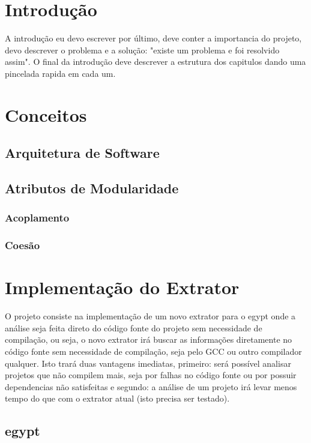 \chapter{Introdução}

A introdução eu devo escrever por último, deve conter a importancia do projeto,
devo descrever o problema e a solução: "existe um problema e foi resolvido
assim". O final da introdução deve descrever a estrutura dos capitulos dando
uma pincelada rapida em cada um.

\chapter{Conceitos}
\section{Arquitetura de Software}
\section{Atributos de Modularidade}
\subsection{Acoplamento}
\subsection{Coesão}

\chapter{Implementação do Extrator}

O projeto consiste na implementação de um novo extrator para o egypt onde a
análise seja feita direto do código fonte do projeto sem necessidade de
compilação, ou seja, o novo extrator irá buscar as informações diretamente no
código fonte sem necessidade de compilação, seja pelo GCC ou outro compilador
qualquer. Isto trará duas vantagens imediatas, primeiro: será possível analisar
projetos que não compilem mais, seja por falhas no código fonte ou por possuir
dependencias não satisfeitas e segundo: a análise de um projeto irá levar menos
tempo do que com o extrator atual (isto precisa ser testado).

\section{egypt}

